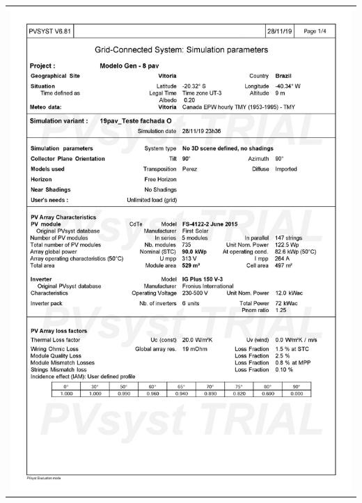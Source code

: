 \begin{table}[H]
    \centering
    \begin{tabular}{l}
        \includegraphics[width=\textwidth]{figures/attachments/resultpv27.jpg}
    \end{tabular}
\end{table}
\pagebreak
